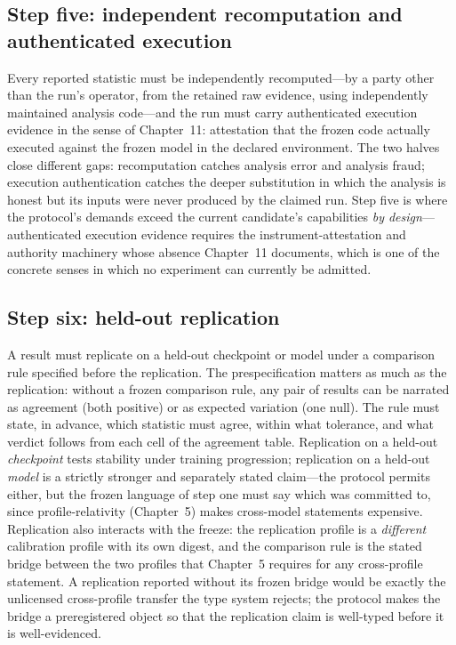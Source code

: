 \subsection{Step five: independent recomputation and authenticated execution}\label{hyp:sec:step5}

Every reported statistic must be independently recomputed---by a party other than the run's operator, from the retained raw evidence, using independently maintained analysis code---and the run must carry authenticated execution evidence in the sense of Chapter~11: attestation that the frozen code actually executed against the frozen model in the declared environment. The two halves close different gaps: recomputation catches analysis error and analysis fraud; execution authentication catches the deeper substitution in which the analysis is honest but its inputs were never produced by the claimed run. Step five is where the protocol's demands exceed the current candidate's capabilities \emph{by design}---authenticated execution evidence requires the instrument-attestation and authority machinery whose absence Chapter~11 documents, which is one of the concrete senses in which no experiment can currently be admitted.

\subsection{Step six: held-out replication}\label{hyp:sec:step6}

A result must replicate on a held-out checkpoint or model under a comparison rule specified before the replication. The prespecification matters as much as the replication: without a frozen comparison rule, any pair of results can be narrated as agreement (both positive) or as expected variation (one null). The rule must state, in advance, which statistic must agree, within what tolerance, and what verdict follows from each cell of the agreement table. Replication on a held-out \emph{checkpoint} tests stability under training progression; replication on a held-out \emph{model} is a strictly stronger and separately stated claim---the protocol permits either, but the frozen language of step one must say which was committed to, since profile-relativity (Chapter~5) makes cross-model statements expensive. Replication also interacts with the freeze: the replication profile is a \emph{different} calibration profile with its own digest, and the comparison rule is the stated bridge between the two profiles that Chapter~5 requires for any cross-profile statement. A replication reported without its frozen bridge would be exactly the unlicensed cross-profile transfer the type system rejects; the protocol makes the bridge a preregistered object so that the replication claim is well-typed before it is well-evidenced.

